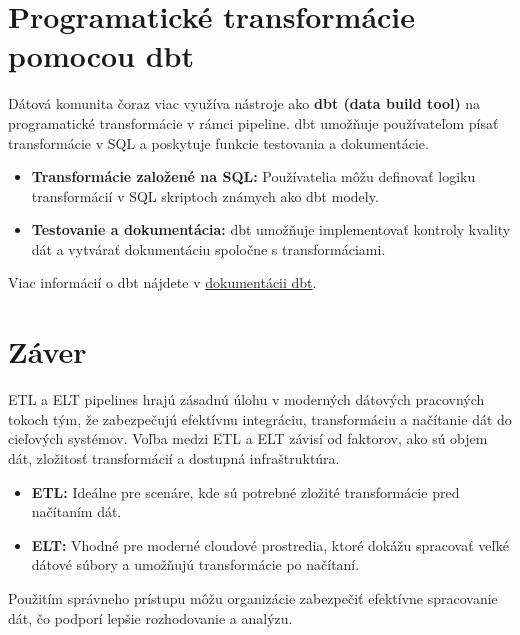 \documentclass{article}
\begin{document}
\section{Programatické transformácie pomocou dbt}

Dátová komunita čoraz viac využíva nástroje ako \textbf{dbt (data build tool)} na programatické transformácie v rámci pipeline. dbt umožňuje používateľom písať transformácie v SQL a poskytuje funkcie testovania a dokumentácie.

\begin{itemize}
    \item \textbf{Transformácie založené na SQL:} Používatelia môžu definovať logiku transformácií v SQL skriptoch známych ako dbt modely.
    \item \textbf{Testovanie a dokumentácia:} dbt umožňuje implementovať kontroly kvality dát a vytvárať dokumentáciu spoločne s transformáciami.
\end{itemize}

Viac informácií o dbt nájdete v \href{https://docs.getdbt.com/}{dokumentácii dbt}.

\section{Záver}

ETL a ELT pipelines hrajú zásadnú úlohu v moderných dátových pracovných tokoch tým, že zabezpečujú efektívnu integráciu, transformáciu a načítanie dát do cieľových systémov. Voľba medzi ETL a ELT závisí od faktorov, ako sú objem dát, zložitosť transformácií a dostupná infraštruktúra.

\begin{itemize}
    \item \textbf{ETL:} Ideálne pre scenáre, kde sú potrebné zložité transformácie pred načítaním dát.
    \item \textbf{ELT:} Vhodné pre moderné cloudové prostredia, ktoré dokážu spracovať veľké dátové súbory a umožňujú transformácie po načítaní.
\end{itemize}

Použitím správneho prístupu môžu organizácie zabezpečiť efektívne spracovanie dát, čo podporí lepšie rozhodovanie a analýzu.
\end{document}
